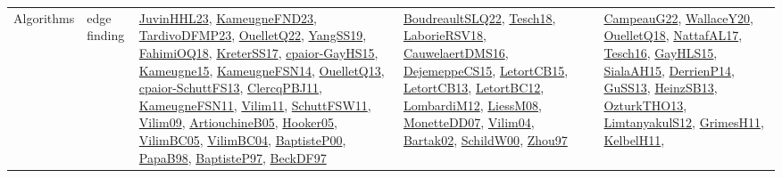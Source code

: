 {\begin{longtable}{llp{6cm}p{6cm}p{6cm}}
Algorithms & edge finding & \href{papers/JuvinHHL23.pdf}{JuvinHHL23}\cite{JuvinHHL23}, \href{papers/KameugneFND23.pdf}{KameugneFND23}\cite{KameugneFND23}, \href{papers/TardivoDFMP23.pdf}{TardivoDFMP23}\cite{TardivoDFMP23}, \href{papers/OuelletQ22.pdf}{OuelletQ22}\cite{OuelletQ22}, \href{papers/YangSS19.pdf}{YangSS19}\cite{YangSS19}, \href{articles/FahimiOQ18.pdf}{FahimiOQ18}\cite{FahimiOQ18}, \href{articles/KreterSS17.pdf}{KreterSS17}\cite{KreterSS17}, \href{papers/cpaior-GayHS15.pdf}{cpaior-GayHS15}\cite{cpaior-GayHS15}, \href{articles/Kameugne15.pdf}{Kameugne15}\cite{Kameugne15}, \href{articles/KameugneFSN14.pdf}{KameugneFSN14}\cite{KameugneFSN14}, \href{papers/OuelletQ13.pdf}{OuelletQ13}\cite{OuelletQ13}, \href{papers/cpaior-SchuttFS13.pdf}{cpaior-SchuttFS13}\cite{cpaior-SchuttFS13}, \href{papers/ClercqPBJ11.pdf}{ClercqPBJ11}\cite{ClercqPBJ11}, \href{papers/KameugneFSN11.pdf}{KameugneFSN11}\cite{KameugneFSN11}, \href{papers/Vilim11.pdf}{Vilim11}\cite{Vilim11}, \href{articles/SchuttFSW11.pdf}{SchuttFSW11}\cite{SchuttFSW11}, \href{papers/Vilim09.pdf}{Vilim09}\cite{Vilim09}, \href{papers/ArtiouchineB05.pdf}{ArtiouchineB05}\cite{ArtiouchineB05}, \href{articles/Hooker05.pdf}{Hooker05}\cite{Hooker05}, \href{articles/VilimBC05.pdf}{VilimBC05}\cite{VilimBC05}, \href{papers/VilimBC04.pdf}{VilimBC04}\cite{VilimBC04}, \href{articles/BaptisteP00.pdf}{BaptisteP00}\cite{BaptisteP00}, \href{articles/PapaB98.pdf}{PapaB98}\cite{PapaB98}, \href{papers/BaptisteP97.pdf}{BaptisteP97}\cite{BaptisteP97}, \href{papers/BeckDF97.pdf}{BeckDF97}\cite{BeckDF97} & \href{papers/BoudreaultSLQ22.pdf}{BoudreaultSLQ22}\cite{BoudreaultSLQ22}, \href{papers/Tesch18.pdf}{Tesch18}\cite{Tesch18}, \href{articles/LaborieRSV18.pdf}{LaborieRSV18}\cite{LaborieRSV18}, \href{papers/CauwelaertDMS16.pdf}{CauwelaertDMS16}\cite{CauwelaertDMS16}, \href{papers/DejemeppeCS15.pdf}{DejemeppeCS15}\cite{DejemeppeCS15}, \href{articles/LetortCB15.pdf}{LetortCB15}\cite{LetortCB15}, \href{papers/LetortCB13.pdf}{LetortCB13}\cite{LetortCB13}, \href{papers/LetortBC12.pdf}{LetortBC12}\cite{LetortBC12}, \href{articles/LombardiM12.pdf}{LombardiM12}\cite{LombardiM12}, \href{articles/LiessM08.pdf}{LiessM08}\cite{LiessM08}, \href{papers/MonetteDD07.pdf}{MonetteDD07}\cite{MonetteDD07}, \href{papers/Vilim04.pdf}{Vilim04}\cite{Vilim04}, \href{papers/Bartak02.pdf}{Bartak02}\cite{Bartak02}, \href{articles/SchildW00.pdf}{SchildW00}\cite{SchildW00}, \href{articles/Zhou97.pdf}{Zhou97}\cite{Zhou97} & \href{articles/CampeauG22.pdf}{CampeauG22}\cite{CampeauG22}, \href{articles/WallaceY20.pdf}{WallaceY20}\cite{WallaceY20}, \href{papers/OuelletQ18.pdf}{OuelletQ18}\cite{OuelletQ18}, \href{articles/NattafAL17.pdf}{NattafAL17}\cite{NattafAL17}, \href{papers/Tesch16.pdf}{Tesch16}\cite{Tesch16}, \href{papers/GayHLS15.pdf}{GayHLS15}\cite{GayHLS15}, \href{papers/SialaAH15.pdf}{SialaAH15}\cite{SialaAH15}, \href{papers/DerrienP14.pdf}{DerrienP14}\cite{DerrienP14}, \href{papers/GuSS13.pdf}{GuSS13}\cite{GuSS13}, \href{articles/HeinzSB13.pdf}{HeinzSB13}\cite{HeinzSB13}, \href{articles/OzturkTHO13.pdf}{OzturkTHO13}\cite{OzturkTHO13}, \href{articles/LimtanyakulS12.pdf}{LimtanyakulS12}\cite{LimtanyakulS12}, \href{papers/GrimesH11.pdf}{GrimesH11}\cite{GrimesH11}, \href{articles/KelbelH11.pdf}{KelbelH11}\cite{KelbelH11}, 
\end{longtable}}
